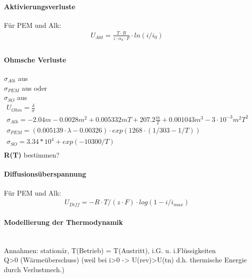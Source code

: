 \paragraph{Aktivierungsverluste}
Für PEM und Alk:
\begin{align}
	U_{Akt} = \frac{T \cdot R}{z \cdot \alpha_k
		\cdot F} \cdot ln(i/i_0)\\ %
\end{align}

\paragraph{Ohmsche Verluste}

$ \sigma _{Alk} $ aus \cite{Low-temperature electrolysis system modelling: A review}\\
$ \sigma _{PEM} $ aus \cite{A review on PEM electrolyzer modelling: Guidelines for beginners} oder \cite{Low-temperature electrolysis system modelling: A review}\\
$ \sigma _{SO} $ aus \cite{Mathematical modeling of solid oxide fuel cells: A review}\\

\begin{align}
	U_{Ohm} = \frac{\delta}{\sigma}\\
	\sigma _{Alk} = -2.04m -0.0028m^2  + 0.005332mT +207.2 \frac{m}{T} +0.001043m^3-3 \cdot 10^{-3}m^2T^2 \\
	\sigma _{PEM} = (0.005139 \cdot \lambda -0.00326) \cdot exp(1268 \cdot (1/303-1/T))\\
	\sigma _{SO} = 3.34*10^4 + exp(-10300/T)\\
\end{align}
\textbf{R(T)} bestimmen?\\

\paragraph{Diffusionsüberspannung}
Für PEM und Alk:
\begin{align}
	U_{Diff} = - R \cdot T/(z \cdot F) \cdot log(1 - i/i_{max})
\end{align}

\paragraph{Modellierung der Thermodynamik}\ \\
Annahmen: stationär, T(Betrieb) = T(Austritt), i.G. u. i.Flüssigkeiten\\
Q>0 (Wärmeüberschuss) (weil bei i>0 -> U(rev)>U(tn) d.h. thermische Energie durch Verlustmech.)\\ 

